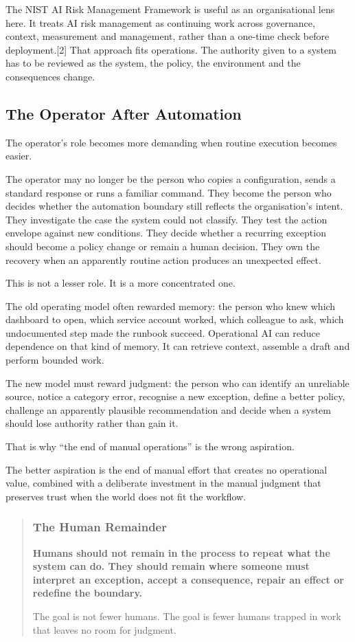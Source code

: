 The NIST AI Risk Management Framework is useful as an organisational
lens here. It treats AI risk management as continuing work across
governance, context, measurement and management, rather than a one-time
check before deployment.{[}2{]} That approach fits operations. The
authority given to a system has to be reviewed as the system, the
policy, the environment and the consequences change.

\subsection{The Operator After
Automation}\label{the-operator-after-automation}

The operator's role becomes more demanding when routine execution
becomes easier.

The operator may no longer be the person who copies a configuration,
sends a standard response or runs a familiar command. They become the
person who decides whether the automation boundary still reflects the
organisation's intent. They investigate the case the system could not
classify. They test the action envelope against new conditions. They
decide whether a recurring exception should become a policy change or
remain a human decision. They own the recovery when an apparently
routine action produces an unexpected effect.

This is not a lesser role. It is a more concentrated one.

The old operating model often rewarded memory: the person who knew which
dashboard to open, which service account worked, which colleague to ask,
which undocumented step made the runbook succeed. Operational AI can
reduce dependence on that kind of memory. It can retrieve context,
assemble a draft and perform bounded work.

The new model must reward judgment: the person who can identify an
unreliable source, notice a category error, recognise a new exception,
define a better policy, challenge an apparently plausible recommendation
and decide when a system should lose authority rather than gain it.

That is why ``the end of manual operations'' is the wrong aspiration.

The better aspiration is the end of manual effort that creates no
operational value, combined with a deliberate investment in the manual
judgment that preserves trust when the world does not fit the workflow.

\begin{quote}
\subsubsection{The Human Remainder}\label{the-human-remainder}

\textbf{Humans should not remain in the process to repeat what the
system can do. They should remain where someone must interpret an
exception, accept a consequence, repair an effect or redefine the
boundary.}

The goal is not fewer humans. The goal is fewer humans trapped in work
that leaves no room for judgment.
\end{quote}

